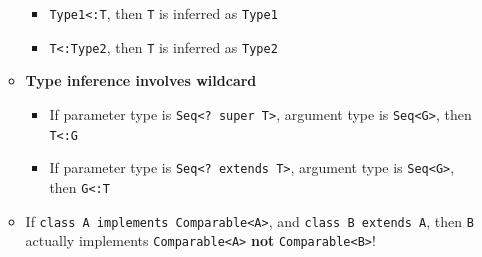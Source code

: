 \documentclass[10pt, landscape]{article}
\begin{document}
\begin{multicols}{4}
\begin{enumerate}
\begin{itemize}
\begin{itemize}
            \item \texttt{Type1<:T}, then \texttt{T} is inferred as \texttt{Type1}
            \item \texttt{T<:Type2}, then \texttt{T} is inferred as \texttt{Type2}
        \end{itemize}
        \item \textbf{Type inference involves wildcard}
        \begin{itemize}
            \item If parameter type is \texttt{Seq<? super T>}, argument type is \texttt{Seq<G>}, then \texttt{T<:G}
            \item If parameter type is \texttt{Seq<? extends T>}, argument type is \texttt{Seq<G>}, then \texttt{G<:T}
        \end{itemize}
        \item If \texttt{class A implements Comparable<A>}, and \texttt{class B extends A}, then \texttt{B} actually implements \texttt{Comparable<A>} \textbf{not} \texttt{Comparable<B>}!
    \end{itemize}
\end{enumerate}

\end{multicols}
\end{document}
